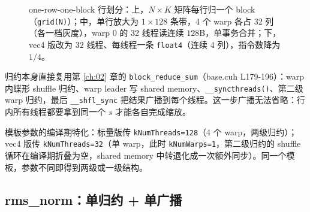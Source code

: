\begin{figure}[H]
\caption{one-row-one-block 行划分：上，$N\times K$ 矩阵每行归一个 block（\texttt{grid(N)}）；中，单行放大为 $1\times128$ 条带，4 个 warp 各占 32 列（各一档灰度），warp 0 的 32 线程读连续 $128$B，单事务合并；下，vec4 版改为 $32$ 线程、每线程一条 \texttt{float4}（连续 4 列），指令数降为 $1/4$。}
\label{fig:6-3}
\end{figure}

归约本身直接复用第 \ref{ch:02} 章的 \texttt{block\_\allowbreak{}reduce\_\allowbreak{}sum}（base.cuh L179-196）：warp 内蝶形 shuffle 归约、warp leader 写 shared memory、\texttt{\_\allowbreak{}\_\allowbreak{}syncthreads\allowbreak{}()}、第二级 warp 归约，最后 \texttt{\_\_shfl\_sync} 把结果广播到每个线程。这一步广播无法省略：行内所有线程都要拿到同一个 $s$ 才能各自完成缩放。



模板参数的编译期特化：标量版传 \texttt{k\allowbreak{}Num\allowbreak{}Threads=\allowbreak{}128}（4 个 warp，两级归约）；vec4 版传 \texttt{k\allowbreak{}Num\allowbreak{}Threads=\allowbreak{}32}（单 warp，此时 \texttt{kNumWarps=1}，第二级归约的 shuffle 循环在编译期折叠为空，shared memory 中转退化成一次额外同步）。同一个模板，参数不同即得到两级或一级结构。

\subsection{rms\_norm：单归约 + 单广播}



